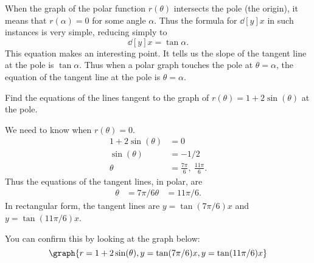 \documentclass{ximera}
\begin{document}
When the graph of the polar function $r(\theta)$ intersects the pole
(the origin), it means that $r(\alpha)=0$ for some angle
$\alpha$. Thus the formula for $\dd[y]{x}$ in such instances is very
simple, reducing simply to
\[
\dd[y]{x}= \tan \alpha.
\]
This equation makes an interesting point. It tells us the slope of the
tangent line at the pole is $\tan \alpha$. Thus when a polar graph
touches the pole at $\theta=\alpha$, the equation of the tangent line
at the pole is $\theta=\alpha$. 

\begin{example}
  Find the equations of the lines tangent to the graph of
  $r(\theta)=1+2\sin(\theta)$ at the pole.
  \begin{explanation}
    We need to know when $r(\theta)=0$.
    \begin{align*}
      1+2\sin(\theta) &= 0\\
      \sin(\theta) &= -1/2\\
      \theta &= \frac{7\pi}{6},\ \frac{11\pi}6.
    \end{align*}
    Thus the equations of the tangent lines, in polar, are
    \begin{align*}
      \theta &=7\pi/6 \theta &= 11\pi/6.
    \end{align*}
    In rectangular form, the tangent lines are $y=\tan(7\pi/6)x$ and
    $y=\tan(11\pi/6)x$.
    \begin{prompt}
     You can confirm this by looking at the graph below:
     \[
     \graph{r=1+2\sin(\theta),y=\tan(7\pi/6)x,y=\tan(11\pi/6)x}
     \]
   \end{prompt}
  \end{explanation}
\end{example}
\end{document}
